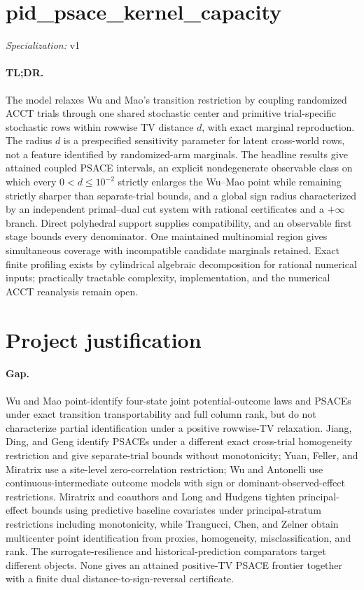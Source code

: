 \documentclass{article}
\begin{document}
\sloppy

\section*{pid\_\allowbreak{}psace\_\allowbreak{}kernel\_\allowbreak{}capacity}

\noindent\textit{Specialization:} v1\par

\paragraph{TL;DR.} The model relaxes Wu and Mao's transition restriction by coupling randomized ACCT trials through one shared stochastic center and primitive trial-specific stochastic rows within rowwise TV distance \(d\), with exact marginal reproduction. The radius \(d\) is a prespecified sensitivity parameter for latent cross-world rows, not a feature identified by randomized-arm marginals. The headline results give attained coupled PSACE intervals, an explicit nondegenerate observable class on which every \(0<d\le10^{-2}\) strictly enlarges the Wu--Mao point while remaining strictly sharper than separate-trial bounds, and a global sign radius characterized by an independent primal--dual cut system with rational certificates and a \(+\infty\) branch. Direct polyhedral support supplies compatibility, and an observable first stage bounds every denominator. One maintained multinomial region gives simultaneous coverage with incompatible candidate marginals retained. Exact finite profiling exists by cylindrical algebraic decomposition for rational numerical inputs; practically tractable complexity, implementation, and the numerical ACCT reanalysis remain open.

\section{Project justification}

\paragraph{Gap.} Wu and Mao point-identify four-state joint potential-outcome laws and PSACEs under exact transition transportability and full column rank, but do not characterize partial identification under a positive rowwise-TV relaxation. Jiang, Ding, and Geng identify PSACEs under a different exact cross-trial homogeneity restriction and give separate-trial bounds without monotonicity; Yuan, Feller, and Miratrix use a site-level zero-correlation restriction; Wu and Antonelli use continuous-intermediate outcome models with sign or dominant-observed-effect restrictions. Miratrix and coauthors and Long and Hudgens tighten principal-effect bounds using predictive baseline covariates under principal-stratum restrictions including monotonicity, while Trangucci, Chen, and Zelner obtain multicenter point identification from proxies, homogeneity, misclassification, and rank. The surrogate-resilience and historical-prediction comparators target different objects. None gives an attained positive-TV PSACE frontier together with a finite dual distance-to-sign-reversal certificate.
\end{document}
